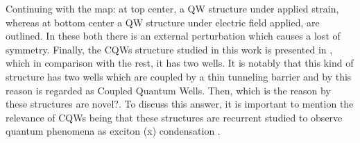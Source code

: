 Continuing with the map: at top center,   a \gls{QW} structure under applied strain, whereas at bottom center   a \gls{QW} structure under electric field applied, are outlined. In these both there is an external perturbation which causes a lost of symmetry. Finally, the \gls{CQWs} structure studied in this work is presented in  , which in comparison with the rest, it has two wells. It is notably that this kind of structure has two wells which are coupled by a thin tunneling barrier and by this reason is regarded as Coupled Quantum Wells. Then, which is the reason by these structures are novel?. To discuss this answer, it
is important to mention the relevance of \gls{CQWs} being that these structures are recurrent studied to observe quantum phenomena as exciton (\gls{x}) condensation \cite{butov1994condensation,butov2002towards,grosso2009excitonic}.


